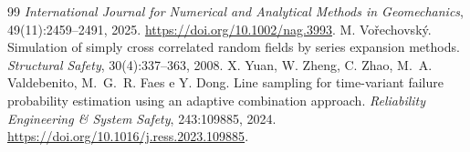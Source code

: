 \documentclass[11pt,a4paper]{article}
\begin{document}
\begin{thebibliography}{99}
  \emph{International Journal for Numerical and Analytical Methods in Geomechanics}, 49(11):2459--2491, 2025.
  \url{https://doi.org/10.1002/nag.3993}.
 M. Vo\v{r}echovsk\'y. Simulation of simply cross correlated random
  fields by series expansion methods. \emph{Structural Safety}, 30(4):337--363, 2008.
 X. Yuan, W. Zheng, C. Zhao, M.~A. Valdebenito, M.~G.~R. Faes e Y. Dong. Line
  sampling for time-variant failure probability estimation using an adaptive combination approach. \emph{Reliability
  Engineering \& System Safety}, 243:109885, 2024. \url{https://doi.org/10.1016/j.ress.2023.109885}.
\end{thebibliography}
\end{document}
